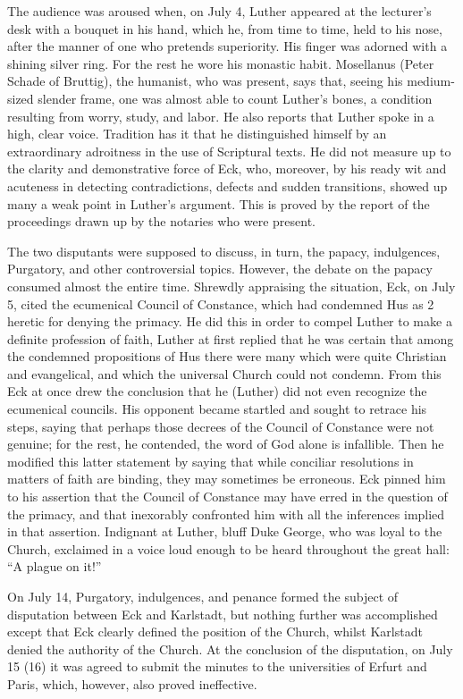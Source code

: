 The audience was aroused when, on July 4, Luther appeared at the
lecturer’s desk with a bouquet in his hand, which he, from time to
time, held to his nose, after the manner of one who pretends superiority.
His finger was adorned with a shining silver ring. For the rest he
wore his monastic habit. Mosellanus (Peter Schade of Bruttig), the
humanist, who was present, says that, seeing his medium-sized slender
frame, one was almost able to count Luther’s bones, a condition
resulting from worry, study, and labor. He also reports that Luther
spoke in a high, clear voice. Tradition has it that he distinguished
himself by an extraordinary adroitness in the use of Scriptural texts.
He did not measure up to the clarity and demonstrative force of
Eck, who, moreover, by his ready wit and acuteness in detecting
contradictions, defects and sudden transitions, showed up many a
weak point in Luther’s argument. This is proved by the report of
the proceedings drawn up by the notaries who were present.

The two disputants were supposed to discuss, in turn, the papacy,
indulgences, Purgatory, and other controversial topics. However, the
debate on the papacy consumed almost the entire time. Shrewdly
appraising the situation, Eck, on July 5, cited the ecumenical Council
of Constance, which had condemned Hus as 2 heretic for denying
the primacy. He did this in order to compel Luther to make a definite
profession of faith, Luther at first replied that he was certain that
among the condemned propositions of Hus there were many which
were quite Christian and evangelical, and which the universal Church
could not condemn. From this Eck at once drew the conclusion
that he (Luther) did not even recognize the ecumenical councils.
His opponent became startled and sought to retrace his steps, saying
that perhaps those decrees of the Council of Constance were not
genuine; for the rest, he contended, the word of God alone is infallible.
Then he modified this latter statement by saying that while
conciliar resolutions in matters of faith are binding, they may sometimes
be erroneous. Eck pinned him to his assertion that the Council
of Constance may have erred in the question of the primacy, and that
inexorably confronted him with all the inferences implied in that
assertion. Indignant at Luther, bluff Duke George, who
was loyal to the Church, exclaimed in a voice loud enough to be heard
throughout the great hall: “A plague on it!”

On July 14, Purgatory, indulgences, and penance formed the
subject of disputation between Eck and Karlstadt, but nothing
further was accomplished except that Eck clearly defined the position
of the Church, whilst Karlstadt denied the authority of the Church.
At the conclusion of the disputation, on July 15 (16) it was agreed
to submit the minutes to the universities of Erfurt and Paris, which,
however, also proved ineffective.

